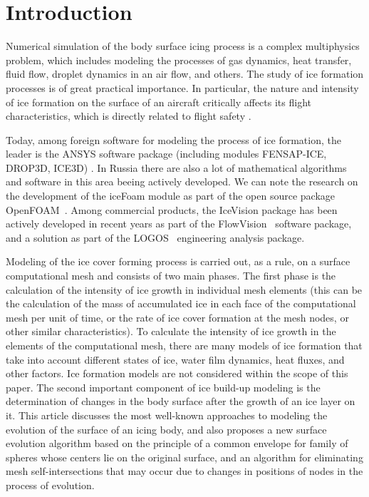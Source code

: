 \documentclass[
11pt,
tightenlines,
twoside,
onecolumn,
nofloats,
nobibnotes,
nofootinbib,
superscriptaddress,
noshowpacs,
centertags]
{revtex4-2}
\begin{document}

\maketitle


\section{Introduction}

Numerical simulation of the body surface icing process is a complex multiphysics problem, which includes modeling the processes of gas dynamics, heat transfer, fluid flow, droplet dynamics in an air flow, and others.
The study of ice formation processes is of great practical importance.
In particular, the nature and intensity of ice formation on the surface of an aircraft critically affects its flight characteristics, which is directly related to flight safety \cite{Raj}.

Today, among foreign software for modeling the process of ice formation, the leader is the ANSYS software package (including modules FENSAP-ICE, DROP3D, ICE3D) \cite{Martini}.
In Russia there are also a lot of mathematical algorithms and software in this area beeing actively developed.
We can note the research on the development of the iceFoam module as part of the open source package OpenFOAM~\cite{Strijhak}.
Among commercial products, the IceVision package has been actively developed in recent years as part of the FlowVision~\cite{Sorokin} software package, and a solution as part of the LOGOS~\cite{Galanov} engineering analysis package.

Modeling of the ice cover forming process is carried out, as a rule, on a surface computational mesh and consists of two main phases.
The first phase is the calculation of the intensity of ice growth in individual mesh elements (this can be the calculation of the mass of accumulated ice in each face of the computational mesh per unit of time, or the rate of ice cover formation at the mesh nodes, or other similar characteristics).
To calculate the intensity of ice growth in the elements of the computational mesh, there are many models of ice formation \cite{Bartkus,Zhang,Pena} that take into account different states of ice, water film dynamics, heat fluxes, and other factors.
Ice formation models are not considered within the scope of this paper.
The second important component of ice build-up modeling is the determination of changes in the body surface after the growth of an ice layer on it.
This article discusses the most well-known approaches to modeling the evolution of the surface of an icing body, and also proposes a new surface evolution algorithm based on the principle of a common envelope for family of spheres whose centers lie on the original surface, and an algorithm for eliminating mesh self-intersections that may occur due to changes in positions of nodes in the process of evolution.
\end{document}
